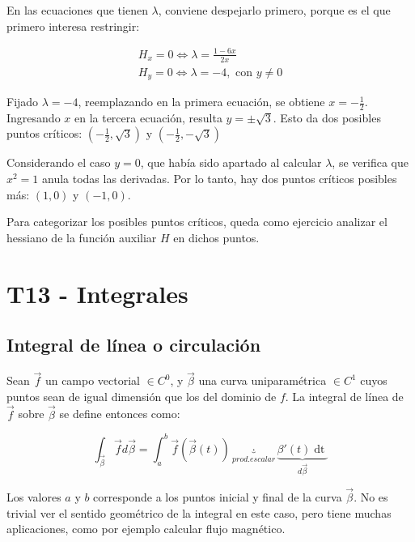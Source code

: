 \documentclass{article}
\begin{document}
En las ecuaciones que tienen $\lambda$, conviene despejarlo primero, porque es el que primero interesa restringir:

\begin{equation}
\begin{array}{ll}
H_x = 0 \Leftrightarrow \lambda = \frac{1-6x}{2x} \\
H_y = 0 \Leftrightarrow \lambda = -4, \text{ con } y \neq 0
\end{array}
\end{equation}

Fijado $\lambda = -4$, reemplazando en la primera ecuación, se obtiene $x = -\frac{1}{2}$. Ingresando $x$ en la tercera ecuación, resulta $y = \pm \sqrt{3}$. Esto da dos posibles puntos críticos: $(-\frac{1}{2}, \sqrt{3})$ y $(-\frac{1}{2}, -\sqrt{3})$

Considerando el caso $y = 0$, que había sido apartado al calcular $\lambda$, se verifica que $x^2 = 1$ anula todas las derivadas. Por lo tanto, hay dos puntos críticos posibles más: $(1, 0)$ y $(-1, 0)$.

Para categorizar los posibles puntos críticos, queda como ejercicio analizar el hessiano de la función auxiliar $H$ en dichos puntos.

\section{T13 - Integrales}

\subsection{Integral de línea o circulación}

Sean $\overrightarrow{f}$ un campo vectorial $\in C^0$, y $\overrightarrow{\beta}$ una curva uniparamétrica $\in C^1$ cuyos puntos sean de igual dimensión que los del dominio de $f$. La integral de línea de $\overrightarrow{f}$ sobre $\overrightarrow{\beta}$ se define entonces como:

\begin{equation}
\int_{\overrightarrow{\beta}} \overrightarrow{f} d\overrightarrow{\beta} = \int_{a}^{b} \overrightarrow{f}(\overrightarrow{\beta}(t)) \underbrace{\cdot}_{prod. escalar} \underbrace{ \beta '(t) \mathop{dt} }_{d\overrightarrow{\beta}}
\end{equation}

Los valores $a$ y $b$ corresponde a los puntos inicial y final de la curva $\overrightarrow{\beta}$. No es trivial ver el sentido geométrico de la integral en este caso, pero tiene muchas aplicaciones, como por ejemplo calcular flujo magnético.
\end{document}
